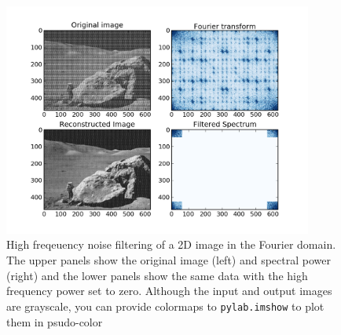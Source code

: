 

\begin{figure}
  \begin{centering} \includegraphics[width=4in]{fig/fft_imdenoise} \par
  \end{centering}

  \caption{\label{fig:fft_imdenoise}High freqeuency noise filtering of a 2D
    image in the Fourier domain.  The upper panels show the original image
    (left) and spectral power (right) and the lower panels show the same data
    with the high frequency power set to zero.  Although the input and output
    images are grayscale, you can provide colormaps to \texttt{pylab.imshow} to
    plot them in psudo-color}
\end{figure}
